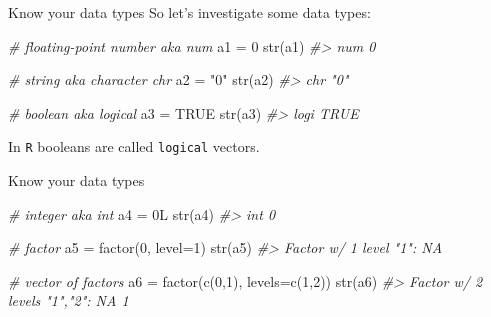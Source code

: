 \documentclass[
  11pt,
  ignorenonframetext,
  svgnames, handout, t]{beamer}
\newenvironment{Shaded}{\begin{snugshade}}{\end{snugshade}}
\newcommand{\AttributeTok}[1]{\textcolor[rgb]{0.77,0.63,0.00}{#1}}
\newcommand{\CommentTok}[1]{\textcolor[rgb]{0.56,0.35,0.01}{\textit{#1}}}
\newcommand{\ConstantTok}[1]{\textcolor[rgb]{0.00,0.00,0.00}{#1}}
\newcommand{\DecValTok}[1]{\textcolor[rgb]{0.00,0.00,0.81}{#1}}
\newcommand{\FunctionTok}[1]{\textcolor[rgb]{0.00,0.00,0.00}{#1}}
\newcommand{\NormalTok}[1]{#1}
\newcommand{\OtherTok}[1]{\textcolor[rgb]{0.56,0.35,0.01}{#1}}
\newcommand{\StringTok}[1]{\textcolor[rgb]{0.31,0.60,0.02}{#1}}
\begin{document}
\begin{frame}[fragile]{Know your data types}
\protect\hypertarget{know-your-data-types-3}{}
So let's investigate some data types:

\footnotesize

\begin{Shaded}
\begin{Highlighting}[]
\CommentTok{\# floating{-}point number aka num}
\NormalTok{a1 }\OtherTok{=} \DecValTok{0}
\FunctionTok{str}\NormalTok{(a1)}
\CommentTok{\#\textgreater{}  num 0}

\CommentTok{\# string aka character chr}
\NormalTok{a2 }\OtherTok{=} \StringTok{"0"}
\FunctionTok{str}\NormalTok{(a2)}
\CommentTok{\#\textgreater{}  chr "0"}

\CommentTok{\# boolean aka logical}
\NormalTok{a3 }\OtherTok{=} \ConstantTok{TRUE}
\FunctionTok{str}\NormalTok{(a3)}
\CommentTok{\#\textgreater{}  logi TRUE}
\end{Highlighting}
\end{Shaded}

\normalsize In \texttt{R} booleans are called \texttt{logical} vectors.
\end{frame}

\begin{frame}[fragile]{Know your data types}
\protect\hypertarget{know-your-data-types-4}{}
\footnotesize

\begin{Shaded}
\begin{Highlighting}[]
\CommentTok{\# integer aka int}
\NormalTok{a4 }\OtherTok{=}\NormalTok{ 0L}
\FunctionTok{str}\NormalTok{(a4)}
\CommentTok{\#\textgreater{}  int 0}

\CommentTok{\# factor}
\NormalTok{a5 }\OtherTok{=} \FunctionTok{factor}\NormalTok{(}\DecValTok{0}\NormalTok{, }\AttributeTok{level=}\DecValTok{1}\NormalTok{)}
\FunctionTok{str}\NormalTok{(a5)}
\CommentTok{\#\textgreater{}  Factor w/ 1 level "1": NA}

\CommentTok{\# vector of factors}
\NormalTok{a6 }\OtherTok{=} \FunctionTok{factor}\NormalTok{(}\FunctionTok{c}\NormalTok{(}\DecValTok{0}\NormalTok{,}\DecValTok{1}\NormalTok{), }\AttributeTok{levels=}\FunctionTok{c}\NormalTok{(}\DecValTok{1}\NormalTok{,}\DecValTok{2}\NormalTok{))}
\FunctionTok{str}\NormalTok{(a6)}
\CommentTok{\#\textgreater{}  Factor w/ 2 levels "1","2": NA 1}
\end{Highlighting}
\end{Shaded}

\normalsize
\end{frame}
\end{document}
